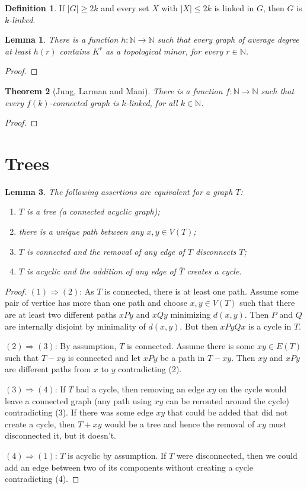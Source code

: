 \documentclass[12pt]{article}
\theoremstyle{plain}
\newtheorem{thm}{Theorem}
\newtheorem{lem}[thm]{Lemma}
\theoremstyle{definition}
\newtheorem{defn}{Definition}[section]
\theoremstyle{remark}
\newcommand{\card}[1]{\left|#1\right|}
\begin{document}
\begin{defn}
If $\card{G} \geq 2k$ and every set $X$ with $\card{X} \leq 2k$ is linked in $G$, then $G$ is \emph{$k$-linked}.
\end{defn}

\begin{lem}
There is a function $h\colon \mathbb{N} \rightarrow \mathbb{N}$ such that every graph of average degree at least $h(r)$ contains $K^r$ as a topological minor, for every $r \in \mathbb{N}$.
\end{lem}
\begin{proof}
\end{proof}

\begin{thm}[Jung, Larman and Mani]
There is a function $f\colon \mathbb{N} \rightarrow \mathbb{N}$ such that every $f(k)$-connected graph is $k$-linked, for all $k \in \mathbb{N}$.
\end{thm}
\begin{proof}
\end{proof}

\section{Trees}
\begin{lem}\label{Tree}
The following assertions are equivalent for a graph $T$:
\begin{enumerate}
\item $T$ is a tree (a connected acyclic graph); 
\item there is a unique path between any $x, y \in V(T)$; 
\item $T$ is connected and the removal of any edge of $T$ disconnects $T$; 
\item $T$ is acyclic and the addition of any edge of $\overline{T}$ creates a cycle.
\end{enumerate}
\end{lem}
\begin{proof}
$(1) \Rightarrow (2)$: As $T$ is connected, there is at least one path. Assume some pair of vertice has more than one path and choose $x, y \in V(T)$ such that there are at least two different paths $xPy$ and $xQy$ minimizing $d(x, y)$.  Then $P$ and $Q$ are internally disjoint by minimality of $d(x,y)$.  But then $xPyQx$ is a cycle in $T$.

$(2) \Rightarrow (3)$:  By assumption, $T$ is connected.  Assume there is some $xy \in E(T)$ such that $T-xy$ is connected and let $xPy$ be a path in $T-xy$.  Then $xy$ and $xPy$ are different paths from $x$ to $y$ contradicting (2).

$(3) \Rightarrow (4)$: If $T$ had a cycle, then removing an edge $xy$ on the cycle would leave a connected graph (any path using $xy$ can be rerouted around the cycle) contradicting (3).  If there was some edge $xy$ that could be added that did not create a cycle, then $T + xy$ would be a tree and hence the removal of $xy$ must disconnected it, but it doesn't.

$(4) \Rightarrow (1)$: $T$ is acyclic by assumption. If $T$ were disconnected, then we could add an edge between two of its components without creating a cycle contradicting (4).
\end{proof}
\end{document}
